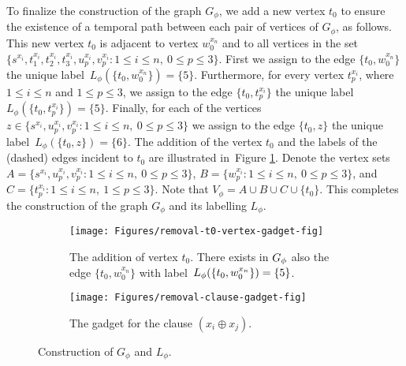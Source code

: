 \documentclass[a4paper,UKenglish]{article}
\begin{document}
To finalize the construction of the graph $G_{\phi}$, we add a new vertex $t_{0}$ to ensure 
the existence of a temporal path between each pair of vertices of $G_{\phi}$, as follows. 
This new vertex $t_{0}$ is adjacent to vertex $w_{0}^{x_{n}}$ 
and to all vertices in the 
set $\{s^{x_{i}},t_{1}^{x_{i}},t_{2}^{x_{i}},t_{3}^{x_{i}},u_{p}^{x_{i}},v_{p}^{x_{i}}:1\leq i\leq n,\ 0\leq p\leq 3\} 
$. First we assign to the edge $\{  t_{0}  ,  w_{0}^{x_{n}}  \}$ the unique label~$L _{\phi }(  \{  t_{0}  ,  w_{0}^{x_{n}}  \} )=\{5\}$. Furthermore, for every vertex $t_{p}^{x_{i}}$, where $1\leq i\leq n$ and $1\leq p\leq 3$, we assign to the
edge $  \{  t_{0}  ,  t_{p}^{x_{i}}  \} $ the unique label~$L _{\phi
}(  \{  t_{0}  ,  t_{p}^{x_{i}}  \} )=\{5\}$. Finally, for each of the vertices $z\in
\{s^{x_{i}},u_{p}^{x_{i}},v_{p}^{x_{i}}:1\leq i\leq n,\ 0\leq p\leq 3\}$ we
assign to the edge $ \{ t_{0}  ,  z  \} $ the unique label~$L _{\phi }(  \{  t_{0}  ,  z  \}  )=\{6\}$. 
The addition of the vertex $t_{0}$ and the labels of the (dashed) edges
incident to $t_{0}$ are illustrated in~Figure \ref{removal-t0-vertex-gadget-fig}.
Denote the vertex sets $A=\{s^{x_{i}},u_{p}^{x_{i}},v_{p}^{x_{i}}:1\leq i\leq n,\ 0\leq p\leq 3\}$, $B=\{w_{p}^{x_{i}}:1\leq i\leq n,\ 0\leq p\leq 3\}$, and $C=\{t_{p}^{x_{i}}:1\leq i\leq n,\ 1\leq p\leq 3\}$. 
Note that $V_{\phi }=A\cup B\cup C\cup \{t_{0}\}$. 
This completes the construction of the graph $G_{\phi }$ and its labelling $L _{\phi }$.



\begin{figure}[tbh]
\centering
\begin{subfigure}[t]{.8\linewidth}
\centering \texttt{[image: Figures/removal-t0-vertex-gadget-fig]} \hspace{0,2cm}
\caption{The addition of vertex $t_{0}$. There exists in $G_{\protect\phi }$ also the edge $  \{  t_{0}  ,  w_{0}^{x_{n}}  \}  $ with label~$\protect L _{\protect\phi }(\{  t_{0}  ,  w_{0}^{x_{n}}  \}  )=\{5\}$.}
\label{removal-t0-vertex-gadget-fig}
\end{subfigure}
\begin{subfigure}[b]{.8\linewidth}
\centering \texttt{[image: Figures/removal-clause-gadget-fig]}
\caption{The gadget for the clause $(x_{i}\oplus x_{j})$.}
\label{removal-clause-gadget-fig}
\end{subfigure}
\caption{Construction of $G_\phi$ and $L_\phi$.}
\label{removal-gadgets-fig}
\end{figure}
\end{document}
